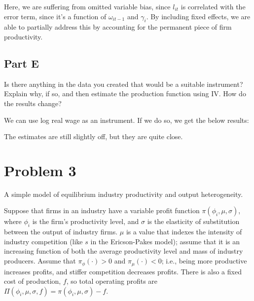 \documentclass[10pt]{article}
\begin{document}
Here, we are suffering from omitted variable bias, since $l_{it}$
is correlated with the error term, since it's a function of $\omega_{it-1}$
and $\gamma_i$. By including fixed effects, we are able to partially address this
by accounting for the permanent piece of firm productivity.


\FloatBarrier

\subsection{Part E}

Is there anything in the data you created that would be a suitable instrument? Explain why, if so, and then estimate the production function using IV. How do the results change?

\hrulefill\hspace{0.5em}\dotfill\hspace{0.5em}\hrulefill

We can use log real wage as an instrument. If we do so, 
we get the below results:



The estimates are still slightly off, but they are quite close.



\section{Problem 3}

A simple model of equilibrium industry productivity and output heterogeneity.

Suppose that firms in an industry have a variable profit function $\pi\left(\phi_i, \mu, \sigma\right)$, where $\phi_i$ is the firm's productivity level, and $\sigma$ is the elasticity of substitution between the output of industry firms. $\mu$ is a value that indexes the intensity of industry competition (like $s$ in the Ericson-Pakes model); assume that it is an increasing function of both the average productivity level and mass of industry producers. Assume that $\pi_\phi(\cdot)>0$ and $\pi_\mu(\cdot)<0$; i.e., being more productive increases profits, and stiffer competition decreases profits. There is also a fixed cost of production, $f$, so total operating profits are $\Pi\left(\phi_i, \mu, \sigma, f\right)=\pi\left(\phi_i, \mu, \sigma\right)-f$.
\end{document}
